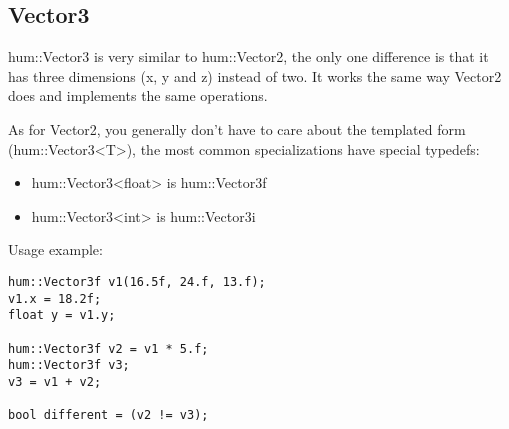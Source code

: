 \subsection{Vector3}

hum::Vector3 is very similar to hum::Vector2, the only one difference is that it 
has three dimensions (x, y and z) instead of two. It works the same way Vector2 does 
and implements the same operations.

As for Vector2, you generally don't have to care about the templated form (hum::Vector3<T>),
the most common specializations have special typedefs:
\begin{itemize}
\item hum::Vector3<float> is hum::Vector3f
\item hum::Vector3<int> is hum::Vector3i
\end{itemize}

Usage example:
\begin{lstlisting}[caption=Vec3 example]
hum::Vector3f v1(16.5f, 24.f, 13.f);
v1.x = 18.2f;
float y = v1.y;

hum::Vector3f v2 = v1 * 5.f;
hum::Vector3f v3;
v3 = v1 + v2;

bool different = (v2 != v3);
\end{lstlisting}
